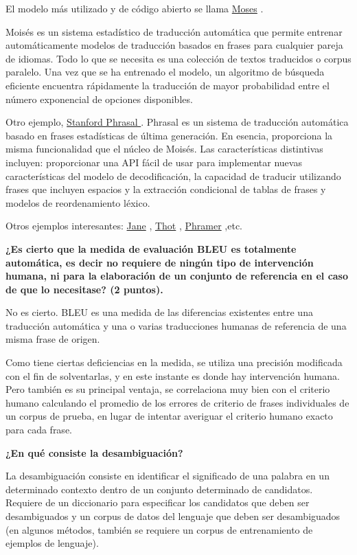 \documentclass[11pt]{exam}
\begin{document}
\begin{questions}
El modelo más utilizado y de código abierto se llama \href{http://www.statmt.org/moses/}{Moses} .

Moisés es un sistema estadístico de traducción automática que permite entrenar automáticamente modelos de traducción basados en frases para cualquier pareja de idiomas. Todo lo que se necesita es una colección de textos traducidos o corpus paralelo. Una vez que se ha entrenado el modelo, un algoritmo de búsqueda eficiente encuentra rápidamente la traducción de mayor probabilidad entre el número exponencial de opciones disponibles.

Otro ejemplo, \href{https://nlp.stanford.edu/phrasal/}{Stanford Phrasal } . Phrasal es un sistema de traducción automática basado en frases estadísticas de última generación. En esencia, proporciona la misma funcionalidad que el núcleo de Moisés. Las características distintivas incluyen: proporcionar una API fácil de usar para implementar nuevas características del modelo de decodificación, la capacidad de traducir utilizando frases que incluyen espacios y la extracción condicional de tablas de frases y modelos de reordenamiento léxico.

Otros ejemplos interesantes: \href{http://www-i6.informatik.rwth-aachen.de/jane/}{Jane} , \href{https://sourceforge.net/projects/thot/}{Thot} , \href{http://www.hlt.utdallas.edu/~marian/phramer/}{Phramer} ,etc.

{\bf \question ¿Es cierto que la medida de evaluación BLEU es totalmente automática, es decir no requiere de ningún tipo de intervención humana, ni para la elaboración de un conjunto de referencia en el caso de que lo necesitase? (2 puntos).}

No es cierto. BLEU es una medida de las diferencias existentes entre una traducción automática y una o varias traducciones humanas de referencia de una misma frase de origen.

Como tiene ciertas deficiencias en la medida, se utiliza una precisión modificada con el fin de solventarlas, y en este instante es donde hay intervención humana. Pero también es su principal ventaja, se correlaciona muy bien con el criterio humano calculando el promedio de los errores de criterio de frases individuales de un corpus de prueba, en lugar de intentar averiguar el criterio humano exacto para cada frase.

{\bf \question ¿En qué consiste la desambiguación?}

La desambiguación consiste en identificar el significado de una palabra en un determinado contexto dentro de un conjunto determinado de candidatos. Requiere de un diccionario para especificar los candidatos que deben ser desambiguados y un corpus de datos del lenguaje que deben ser desambiguados (en algunos métodos, también se requiere un corpus de entrenamiento de ejemplos de lenguaje).


\end{questions}
\end{document}
